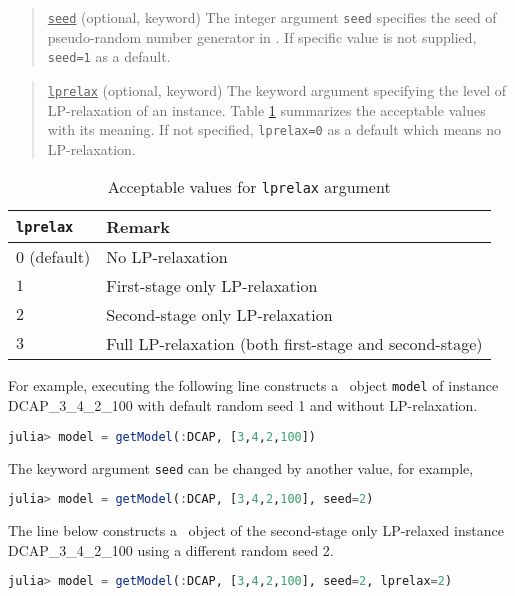 \begin{quote}
	\noindent\underline{\texttt{seed}} (optional, keyword) The integer argument \texttt{seed} specifies the seed of pseudo-random number generator in \julia. If specific value is not supplied, \texttt{seed=1} as a default.
\end{quote}

\begin{quote}
	\noindent\underline{\texttt{lprelax}} (optional, keyword) The keyword argument specifying the level of LP-relaxation of an instance. Table \ref{table:lprelax} summarizes the acceptable values with its meaning. If not specified, \texttt{lprelax=0} as a default which means no LP-relaxation.
\end{quote}

\begin{table}[H]
	\centering
	\caption{Acceptable values for \texttt{lprelax} argument}
	\label{table:lprelax}
	\begin{tabular}{@{}ll@{}}
		\toprule
		\texttt{lprelax} & Remark                                            \\ \midrule
		$0$ (default)              & No LP-relaxation                                  \\
		$1$              & First-stage only LP-relaxation                    \\
		$2$              & Second-stage only LP-relaxation                   \\
		$3$              & Full LP-relaxation (both first-stage and second-stage) \\ \bottomrule
	\end{tabular}%
\end{table}

For example, executing the following line constructs a \jumpmodel\ object \texttt{model} of instance DCAP\_3\_4\_2\_100 with default random seed 1 and without LP-relaxation.
\begin{lstlisting}[frame=single,language=julia]
julia> model = getModel(:DCAP, [3,4,2,100])
\end{lstlisting}
The keyword argument \texttt{seed} can be changed by another value, for example,
\begin{lstlisting}[frame=single,language=julia]
julia> model = getModel(:DCAP, [3,4,2,100], seed=2)
\end{lstlisting}
The line below constructs a \jumpmodel\ object of the second-stage only LP-relaxed instance DCAP\_3\_4\_2\_100 using a different random seed 2.
\begin{lstlisting}[frame=single,language=julia]
julia> model = getModel(:DCAP, [3,4,2,100], seed=2, lprelax=2)
\end{lstlisting}




